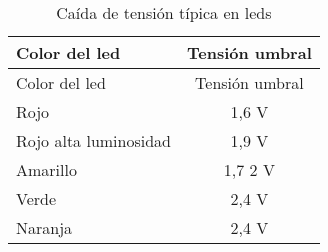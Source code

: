 \begin{longtable}[c]{@{}lc@{}}
\caption{Caída de tensión típica en leds}\tabularnewline
\toprule
\begin{minipage}[b]{0.31\columnwidth}\raggedright\strut
Color del led
\strut\end{minipage} &
\begin{minipage}[b]{0.12\columnwidth}\centering\strut
Tensión umbral
\strut\end{minipage}\tabularnewline
\midrule
\endfirsthead
\toprule
\begin{minipage}[b]{0.31\columnwidth}\raggedright\strut
Color del led
\strut\end{minipage} &
\begin{minipage}[b]{0.12\columnwidth}\centering\strut
Tensión umbral
\strut\end{minipage}\tabularnewline
\midrule
\endhead
\begin{minipage}[t]{0.31\columnwidth}\raggedright\strut
Rojo
\strut\end{minipage} &
\begin{minipage}[t]{0.12\columnwidth}\centering\strut
1,6 V
\strut\end{minipage}\tabularnewline
\begin{minipage}[t]{0.31\columnwidth}\raggedright\strut
Rojo alta luminosidad
\strut\end{minipage} &
\begin{minipage}[t]{0.12\columnwidth}\centering\strut
1,9 V
\strut\end{minipage}\tabularnewline
\begin{minipage}[t]{0.31\columnwidth}\raggedright\strut
Amarillo
\strut\end{minipage} &
\begin{minipage}[t]{0.12\columnwidth}\centering\strut
1,7 2 V
\strut\end{minipage}\tabularnewline
\begin{minipage}[t]{0.31\columnwidth}\raggedright\strut
Verde
\strut\end{minipage} &
\begin{minipage}[t]{0.12\columnwidth}\centering\strut
2,4 V
\strut\end{minipage}\tabularnewline
\begin{minipage}[t]{0.31\columnwidth}\raggedright\strut
Naranja
\strut\end{minipage} &
\begin{minipage}[t]{0.12\columnwidth}\centering\strut
2,4 V
\strut\end{minipage}\tabularnewline

\end{longtable}
